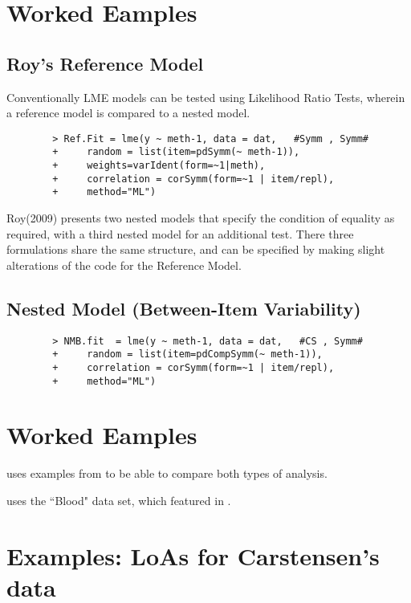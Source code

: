 \documentclass[12pt, a4paper]{report}
\theoremstyle{plain}
\theoremstyle{definition}
\theoremstyle{remark}
\begin{document}
	\section{Worked Eamples}
	\newpage
	\subsection{Roy's Reference Model}
	Conventionally LME models can be tested using Likelihood Ratio Tests, wherein a reference model is compared to a nested model.
	\begin{framed}
		\begin{verbatim}
		> Ref.Fit = lme(y ~ meth-1, data = dat,   #Symm , Symm#
		+     random = list(item=pdSymm(~ meth-1)), 
		+     weights=varIdent(form=~1|meth),
		+     correlation = corSymm(form=~1 | item/repl), 
		+     method="ML")
		\end{verbatim}
	\end{framed}
	
	
	Roy(2009) presents two nested models that specify the condition of equality as required, with a third nested model for an additional test. There three formulations share the same structure, and can be specified by making slight alterations of the code for the Reference Model.
	
	\subsection{Nested Model (Between-Item Variability)}
	\begin{framed}
		\begin{verbatim}
		> NMB.fit  = lme(y ~ meth-1, data = dat,   #CS , Symm#
		+     random = list(item=pdCompSymm(~ meth-1)),
		+     correlation = corSymm(form=~1 | item/repl), 
		+     method="ML")
		\end{verbatim}
	\end{framed}
	
	\newpage
	\section{Worked Eamples}
	
	\citet{ARoy2009} uses examples from \citet{BA86} to be able to
	compare both types of analysis.
	
	\citet{Roy2006} uses the ``Blood" data set, which featured in \citet{BA99}.
	
		\section{Examples: LoAs for Carstensen's data}
\end{document}
